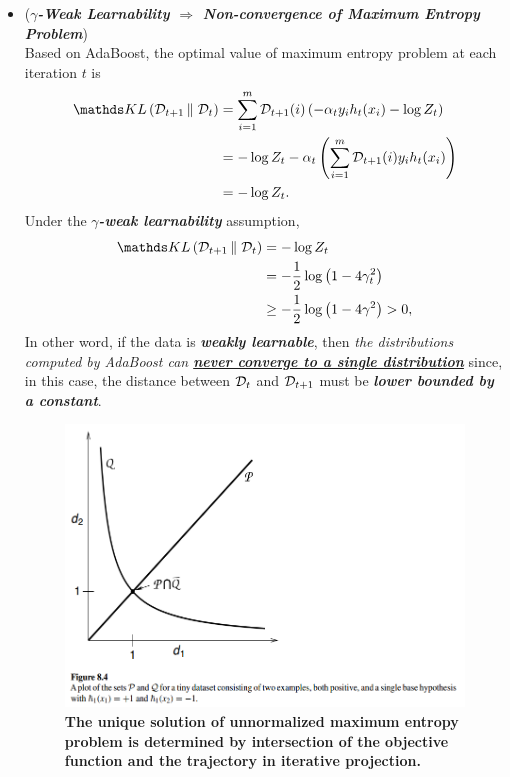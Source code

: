 \documentclass[11pt]{article}
\begin{document}
\begin{itemize}
\item \begin{remark} (\textbf{\emph{$\gamma$-Weak Learnability $\Rightarrow$ Non-convergence of Maximum Entropy Problem}})\\
Based on AdaBoost, the optimal value of maximum entropy problem at each iteration $t$ is 
\begin{align*}
\kl{\cD_{t+1}}{\cD_t} &= \sum_{i=1}^{m}\cD_{t+1}(i)\paren{-\alpha_t y_i h_t(x_i) - \log Z_t}\\
&= -\log Z_t -\alpha_t  \paren{ \sum_{i=1}^{m}\cD_{t+1}(i) y_i h_t(x_i)}\\
&=  -\log Z_t.
\end{align*} Under the  \emph{\textbf{$\gamma$-weak learnability}} assumption, 
\begin{align*}
\kl{\cD_{t+1}}{\cD_t} &=  -\log Z_t \\
&= - \frac{1}{2} \log\paren{1- 4\gamma_t^2} \\
&\ge - \frac{1}{2} \log\paren{1- 4\gamma^2} > 0, 
\end{align*}
In other word,  if the data is \emph{\textbf{weakly learnable}}, then \emph{the distributions computed by AdaBoost can \textbf{\underline{never converge to a single distribution}}} since, in this case, the distance between ${\mathcal D}_t$ and ${\mathcal D}_{t+1}$ must be \emph{\textbf{lower bounded by a constant}}. 
\end{remark}

\begin{figure}
\begin{minipage}[h!]{1\linewidth}
  \centering
  \centerline{\includegraphics[scale = 0.35]{max_ent_boost_unique.png}}
\end{minipage}
\caption{\footnotesize{\textbf{The unique solution of unnormalized maximum entropy problem is determined by intersection of  the objective function and the trajectory in iterative projection.   \citep{schapire2012boosting}}}}
\label{fig: max_ent_boost_unique}
\end{figure}



\end{itemize}
\end{document}
